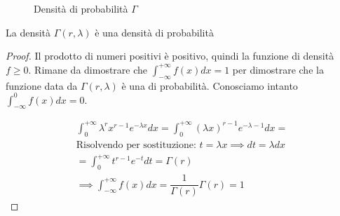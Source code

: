 \begin{defn}
\begin{figure}[htbp!]
        \caption{Densità di probabilità $\Gamma$}
        \label{gammapdf}
    \end{figure}

    \begin{prop}
        La densità $\Gamma(r, \lambda)$ è una densità di probabilità
    \end{prop}

    \begin{proof}
        Il prodotto di numeri positivi è positivo, quindi la funzione di densità
        $f \geq 0$. Rimane da dimostrare che $\int_{-\infty}^{+\infty} f(x) dx =
        1$ per dimostrare che la funzione data da $\Gamma(r, \lambda)$ è una
        di probabilità. Conosciamo intanto $\int_{-\infty}^{0} f(x) dx = 0$.

        \begin{equation*}
            \begin{aligned}
                \int_{0}^{+\infty} \lambda^r x^{r-1} e^{-\lambda x} dx = \int_{0}^{+\infty} (\lambda x)^{r-1} e^{-\lambda -1} dx = \\
                \text{Risolvendo per sostituzione: } t = \lambda x \implies dt = \lambda dx \\
                = \int_{0}^{+\infty} t^{r-1} e^{-t} dt = \Gamma(r) \\
                \implies \int_{-\infty}^{+\infty} f(x) dx = \dfrac{1}{\Gamma(r)} \Gamma(r) = 1
            \end{aligned}
        \end{equation*}
    \end{proof}
\end{defn}

